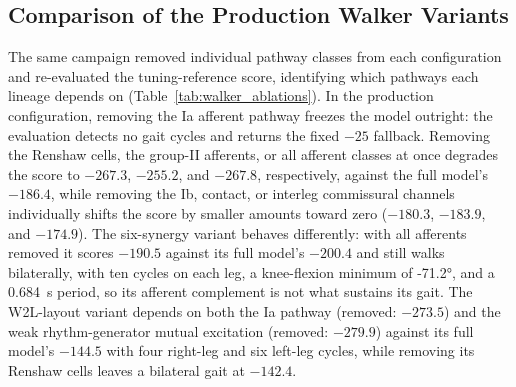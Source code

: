 \subsection{Comparison of the Production Walker Variants}\label{sec:walker_variant_results}

The same campaign removed individual pathway classes from each configuration and re-evaluated the tuning-reference score, identifying which pathways each lineage depends on (Table~\ref{tab:walker_ablations}). In the production configuration, removing the Ia afferent pathway freezes the model outright: the evaluation detects no gait cycles and returns the fixed $-25$ fallback. Removing the Renshaw cells, the group-II afferents, or all afferent classes at once degrades the score to $-267.3$, $-255.2$, and $-267.8$, respectively, against the full model's $-186.4$, while removing the Ib, contact, or interleg commissural channels individually shifts the score by smaller amounts toward zero ($-180.3$, $-183.9$, and $-174.9$). The six-synergy variant behaves differently: with all afferents removed it scores $-190.5$ against its full model's $-200.4$ and still walks bilaterally, with ten cycles on each leg, a knee-flexion minimum of \ang{-71.2}, and a \qty{0.684}{\second} period, so its afferent complement is not what sustains its gait. The W2L-layout variant depends on both the Ia pathway (removed: $-273.5$) and the weak rhythm-generator mutual excitation (removed: $-279.9$) against its full model's $-144.5$ with four right-leg and six left-leg cycles, while removing its Renshaw cells leaves a bilateral gait at $-142.4$.

